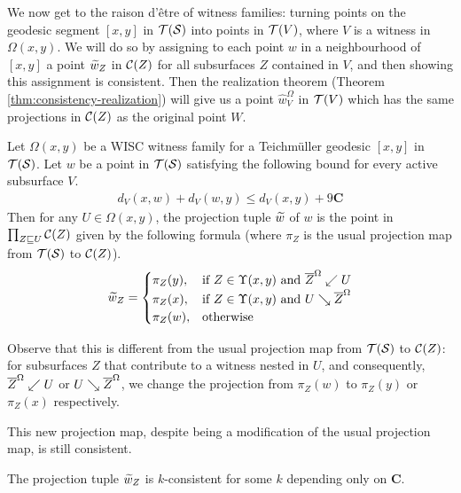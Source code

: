 \documentclass[12pt, reqno]{amsart}
\begin{document}
  We now get to the raison d'\^etre of witness families: turning points on the geodesic segment $[x,y]$ in $\mathcal{T}(\mathcal{S})$ into points in $\mathcal{T}(V)$, where $V$ is a witness in $\Omega(x,y)$.
  We will do so by assigning to each point $w$ in a neighbourhood of $[x,y]$ a point $\widetilde{w}_Z$ in $\mathcal{C}(Z)$ for all subsurfaces $Z$ contained in $V$, and then showing this assignment is consistent.
  Then the realization theorem (Theorem \ref{thm:consistency-realization}) will give us a point $\widehat{w}_V^{\Omega}$ in $\mathcal{T}(V)$ which has the same projections in $\mathcal{C}(Z)$ as the original point $W$.
  \begin{definition}
    \label{def:projection-tuple}
    Let $\Omega(x,y)$ be a WISC witness family for a Teichmüller geodesic $[x,y]$ in $\mathcal{T}(\mathcal{S})$.
    Let $w$ be a point in $\mathcal{T}(\mathcal{S})$ satisfying the following bound for every active subsurface $V$.
    \begin{align*}
      d_{V}(x, w) + d_{V}(w, y) \leq d_{V}(x, y) + 9 \mathbf{C}
    \end{align*}
    Then for any $U \in \Omega(x,y)$, the projection tuple $\widetilde{w}$ of $w$ is the point in $\prod_{Z \sqsubseteq U} \mathcal{C}(Z)$ given by the following formula (where $\pi_Z$ is the usual projection map from $\mathcal{T}(\mathcal{S})$ to $\mathcal{C}(Z)$).
    \begin{align*}
      \widetilde{w}_Z =
      \begin{cases}
        \pi_Z(y), & \text{if $Z \in \Upsilon(x,y)$ and $\overline{Z}^{\Omega} \swarrow U$} \\
        \pi_Z(x), & \text{if $Z \in \Upsilon(x,y)$ and $U \searrow \overline{Z}^{\Omega}$} \\
        \pi_Z(w), & \text{otherwise}
      \end{cases}
    \end{align*}
  \end{definition}

  Observe that this is different from the usual projection map from $\mathcal{T}(\mathcal{S})$ to $\mathcal{C}(Z)$: for subsurfaces $Z$ that contribute to a witness nested in $U$, and consequently, $\overline{Z}^{\Omega} \swarrow U$ or $U \searrow \overline{Z}^{\Omega}$, we change the projection from $\pi_Z(w)$ to $\pi_Z(y)$ or $\pi_Z(x)$ respectively.

  This new projection map, despite being a modification of the usual projection map, is still consistent.
  \begin{proposition}
    The projection tuple $\widetilde{w}_Z$ is $k$-consistent for some $k$ depending only on $\mathbf{C}$.
  \end{proposition}
\end{document}
